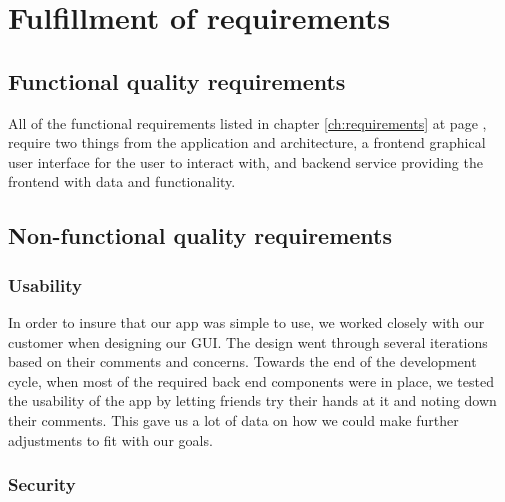 \section{Fulfillment of requirements}

\subsection{Functional quality requirements}
All of the functional requirements listed in chapter \ref{ch:requirements} at page \pageref{ch:requirements}, require two things from the application and architecture, a frontend graphical user interface for the user to interact with, and backend service providing the frontend with data and functionality. 

\subsection{Non-functional quality requirements}

\subsubsection{Usability}
In order to insure that our app was simple to use, we worked closely with our customer when designing our GUI. The design went through several iterations based on their comments and concerns. Towards the end of the development cycle, when most of the required back end components were in place, we tested the usability of the app by letting friends try their hands at it and noting down their comments. This gave us a lot of data on how we could make further adjustments to fit with our goals.

\newpage

\subsubsection{Security}

